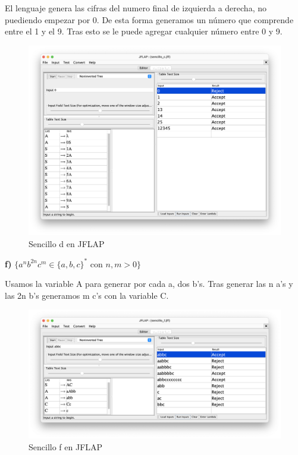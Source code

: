 El lenguaje genera las cifras del numero final de izquierda a derecha, no puediendo empezar por 0. De esta forma generamos un número que comprende
entre el 1 y el 9. Tras esto se le puede agregar cualquier número entre 0 y 9.

\begin{figure}[H] 
	\centering
	\includegraphics[scale=0.35]{../practica_1/images/sencillo_d.png} 
	\caption{Sencillo d en JFLAP} 
    \label{fig:sencillo_d}
\end{figure}

\textbf{f)}  $\{ a^{n} b^{2n} c^{m} \in \{a,b,c\}^{\ast}$ con $n,m > 0\}$

Usamos la variable A para generar por cada a, dos b's. Tras generar las n a's y las 2n b's generamos m c's con la variable C.

\begin{figure}[H] 
	\centering
	\includegraphics[scale=0.35]{../practica_1/images/sencillo_f.png} 
	\caption{Sencillo f en JFLAP} 
    \label{fig:sencillo_f}
\end{figure}


